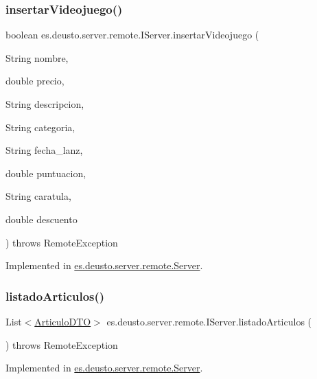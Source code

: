 \subsubsection{\texorpdfstring{insertarVideojuego()}{insertarVideojuego()}}
{\footnotesize\ttfamily boolean es.\+deusto.\+server.\+remote.\+I\+Server.\+insertar\+Videojuego (\begin{DoxyParamCaption}\item[{String}]{nombre,  }\item[{double}]{precio,  }\item[{String}]{descripcion,  }\item[{String}]{categoria,  }\item[{String}]{fecha\+\_\+lanz,  }\item[{double}]{puntuacion,  }\item[{String}]{caratula,  }\item[{double}]{descuento }\end{DoxyParamCaption}) throws Remote\+Exception}



Implemented in \mbox{\hyperlink{classes_1_1deusto_1_1server_1_1remote_1_1_server_a406e093c958d4b85be33d55f79b9879e}{es.\+deusto.\+server.\+remote.\+Server}}.

\mbox{\label{interfacees_1_1deusto_1_1server_1_1remote_1_1_i_server_ac764551111551c2b167bf3d0fb53fc7b}} 
\subsubsection{\texorpdfstring{listadoArticulos()}{listadoArticulos()}}
{\footnotesize\ttfamily List$<$\mbox{\hyperlink{classes_1_1deusto_1_1server_1_1dto_1_1_articulo_d_t_o}{Articulo\+D\+TO}}$>$ es.\+deusto.\+server.\+remote.\+I\+Server.\+listado\+Articulos (\begin{DoxyParamCaption}{ }\end{DoxyParamCaption}) throws Remote\+Exception}



Implemented in \mbox{\hyperlink{classes_1_1deusto_1_1server_1_1remote_1_1_server_af92422f6c88a176f9f424f3d9016ee00}{es.\+deusto.\+server.\+remote.\+Server}}.

